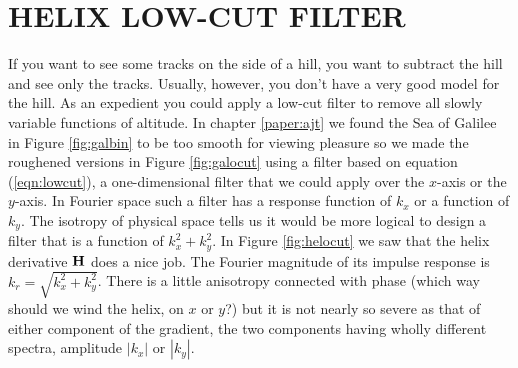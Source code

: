 \begin{comment}
You hear from three different people
that a more isotropic representation
of the Laplacian is minus one sixth of
$$
\begin{array} {rrr}
-1     & -4 &  -1 \\
-4     & 20 &  -4 \\
-1     & -4 &  -1
\end{array}
$$
What changes need to be made to subroutine \texttt{lapfac()}?
%
\item
Fomel's factorization:
A simple trick to avoid division in square root computation is to run
Newton's method on the inverse square root instead.
The iteration is then
$R' = \frac{1}{ 2} R(3-R^2 X^2)$
where $R$ converges (quadratically) to $1/\sqrt{X^2}$.
To get the square root, just multiply $R$ by $X^2$.
This leads to a reciprocal version of the Wilson-Burg algorithm.
$A\T/A + \bar A\T/ \bar A = 3 - A \bar A  S $
Here is how it can work:
Construct an inverse autocorrelation ---
for example,
an ideal isotropic smoother;
make a guess for $A$ (min-phase roughener); iterate:
(1) compute $3 - A A* S$,
(2) take its causal part,
(3) convolve with $A$ to get $A\T$.
Each iteration involves just three convolutions
(could be even done without helix).
\end{exer}

\end{comment}

\section{HELIX LOW-CUT FILTER}
If you want to see some tracks on the side of a hill,
you want to subtract the hill and see only the tracks.
Usually, however, you don't have a very good model for the hill.
As an 
expedient you could apply a low-cut filter to remove all
slowly variable functions of altitude.
In chapter \ref{paper:ajt} we found the Sea of Galilee
in Figure \ref{fig:galbin} to be too smooth for viewing pleasure
so we made the roughened versions
in Figure \ref{fig:galocut}
using a filter based
on equation (\ref{eqn:lowcut}),
a one-dimensional filter that we could apply
over the $x$-axis or the $y$-axis.
In Fourier space such a filter has a response function of $k_x$
or a function of $k_y$.
The isotropy of physical space tells us
it would be more logical to design a filter that
is a function of
$k_x^2+k_y^2$.
In Figure \ref{fig:helocut} we saw that the helix derivative
$\bold H$
does a nice job.
The Fourier magnitude of its impulse response is $k_r=\sqrt{k_x^2+k_y^2}$.
There is a little anisotropy connected with phase (which way should
we wind the helix, on $x$ or $y$?) but it is
not nearly so severe as that of either component of the gradient,
the two components having wholly different spectra,
amplitude $|k_x|$ or $|k_y|$.


